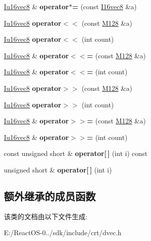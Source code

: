 \begin{DoxyCompactItemize}
\hyperlink{class_iu16vec8}{Iu16vec8} \& {\bfseries operator$\ast$=} (const \hyperlink{class_i16vec8}{I16vec8} \&a)
\item 
\mbox{\label{class_iu16vec8_ab80e0fb4ee837d5caba57faca707a3c9}} 
\hyperlink{class_iu16vec8}{Iu16vec8} {\bfseries operator$<$$<$} (const \hyperlink{class_m128}{M128} \&a)
\item 
\mbox{\label{class_iu16vec8_ae1041ec62564971d332288eb8ee4dc82}} 
\hyperlink{class_iu16vec8}{Iu16vec8} {\bfseries operator$<$$<$} (int count)
\item 
\mbox{\label{class_iu16vec8_ab860bfbf933dcd2722c0ce52898da4fd}} 
\hyperlink{class_iu16vec8}{Iu16vec8} \& {\bfseries operator$<$$<$=} (const \hyperlink{class_m128}{M128} \&a)
\item 
\mbox{\label{class_iu16vec8_a64fc00fddf8847f19f6fd3aff1bfcbce}} 
\hyperlink{class_iu16vec8}{Iu16vec8} \& {\bfseries operator$<$$<$=} (int count)
\item 
\mbox{\label{class_iu16vec8_a99f8c3e6bf9a03b7fb233b5416f4090b}} 
\hyperlink{class_iu16vec8}{Iu16vec8} {\bfseries operator$>$$>$} (const \hyperlink{class_m128}{M128} \&a)
\item 
\mbox{\label{class_iu16vec8_aa5d1c82976989fb69960c5a55b655fed}} 
\hyperlink{class_iu16vec8}{Iu16vec8} {\bfseries operator$>$$>$} (int count)
\item 
\mbox{\label{class_iu16vec8_aba3a6ac3da80af207f52f0a9df59e5ff}} 
\hyperlink{class_iu16vec8}{Iu16vec8} \& {\bfseries operator$>$$>$=} (const \hyperlink{class_m128}{M128} \&a)
\item 
\mbox{\label{class_iu16vec8_ac8cfdf169dee891dd8d92f729019a728}} 
\hyperlink{class_iu16vec8}{Iu16vec8} \& {\bfseries operator$>$$>$=} (int count)
\item 
\mbox{\label{class_iu16vec8_aa67a7d4cb3e6c4ac4985f6f31610d3c9}} 
const unsigned short \& {\bfseries operator\mbox{[}$\,$\mbox{]}} (int i) const
\item 
\mbox{\label{class_iu16vec8_a3306378c902c9883f6ee01572205b58f}} 
unsigned short \& {\bfseries operator\mbox{[}$\,$\mbox{]}} (int i)
\end{DoxyCompactItemize}
\subsection*{额外继承的成员函数}


该类的文档由以下文件生成\+:\begin{DoxyCompactItemize}
\item 
E\+:/\+React\+O\+S-\/0../sdk/include/crt/dvec.\+h\end{DoxyCompactItemize}
